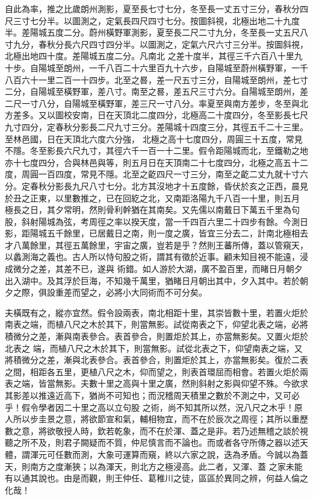 \begin{pinyinscope}
 自此為率，推之比歲朗州測影，夏至長七寸七分，冬至長一丈五寸三分，春秋分四尺三寸七分半。以圖測之，定氣長四尺四寸七分。按圖斜視，北極出地二十九度半。差陽城五度二分。蔚州橫野軍測影，夏至長二尺二寸九分，冬至長一丈五尺八寸九分，春秋分長六尺四寸四分半。以圖測之，定氣六尺六寸三分半。按圖斜視，北極出地四十度。差陽城五度二分。凡南北
 之差十度半，其徑三千六百八十里九十步。自陽城至朗州，一千八百二十六里百九十六步，自陽城至蔚州橫野軍，一千八百六十一里二百一十四步。北至之晷，差一尺五寸三分，自陽城至朗州，差七寸二分，自陽城至橫野軍，差八寸。南至之晷，差五尺三寸六分。自陽城至朗州，差二尺一寸八分，自陽城至橫野軍，差三尺一寸八分。率夏至與南方差步，冬至與北方差多。又以圖校安南，日在天頂北二度四分，北極高二十度四分，冬至影長七尺九寸四分，定春秋分影長二尺九寸三分。差陽城十四度三分，其徑五千二十三里。至林邑國，日在天頂北六度六分強，
 北極之高十七度四分，周圓三十五度，常見不隱。冬至影長六尺九寸，其徑六千一百一十二里。假令距陽城而北，至鐵勒之地亦十七度四分，合與林邑與等，則五月日在天頂南二十七度四分，北極之高五十二度，周圓一百四度，常見不隱。北至之齕四尺一寸三分，南至之齕二丈九就十寸六分。定春秋分影長九尺八寸七分。北方其沒地才十五度餘，昏伏於亥之正西，晨見於丑之正東，以里數推之，已在回紇之北，又南距洛陽九千八百一十里，則五月
 極長之日，其夕常明，然則骨利幹猶在其南矣。又先儒以南戴日下萬五千里為句股，斜射陽城為弦，考周徑之率以揆天度，當一千四百六里二十四步有餘。今測日影，距陽城五千餘里，已居戴日之南，則一度之廣，皆宜三分去二，計南北極相去才八萬餘里，其徑五萬餘里，宇宙之廣，豈若是乎？然則王蕃所傳，蓋以管窺天，以蠡測海之義也。古人所以恃句股之術，謂其有徵於近事。顧未知目視不能遠，浸成微分之差，其差不已，遂與
 術錯。如人游於大湖，廣不盈百里，而睹日月朝夕出入湖中。及其浮於巨海，不知幾千萬里，猶睹日月朝出其中，夕入其中。若於朝夕之際，俱設重差而望之，必將小大同術而不可分矣。



 夫橫既有之，縱亦宜然。假令設兩表，南北相距十里，其崇皆數十里，若置火炬於南表之端，而植八尺之木於其下，則當無影。試從南表之下，仰望北表之端，必將積微分之差，漸與南表參合。表首參合，則置炬於其上，亦當無影矣。又置火炬於北表之
 端，而植八尺之木於其下，則當無影。試從北表之下，仰望南表之端，又將積微分之差，漸與北表參合。表首參合，則置炬於其上，亦當無影矣。復於二表之間，相距各五里，更植八尺之木，仰而望之，則表首環屈而相會。若置火炬於兩表之端，皆當無影。夫數十里之高與十里之廣，然則斜射之影與仰望不殊。今欲求其影差以推遠近高下，猶尚不可知也；而況稽周天積里之數於不測之中，又可必乎！假令學者因二十里之高以立句股
 之術，尚不知其所以然，況八尺之木乎！原人所以步圭景之意，將欲節宣和氣，輔相物宜，而不在於辰次之周徑；其所以重歷數之意，將欲敬授人時，欽若乾象，而不在於渾、蓋之是非。若乃述無稽之談於視聽之所不及，則君子闕疑而不質，仲尼慎言而不論也。而或者各守所傳之器以述天體，謂渾元可任數而測，大象可運算而窺，終以六家之說，迭為矛盾。今誠以為蓋天，則南方之度漸狹；以為渾天，則北方之極浸高。此二者，又渾、蓋
 之家未能有以通其說也。由是而觀，則王仲任、葛稚川之徒，區區於異同之辨，何益人倫之化哉！




\end{pinyinscope}
